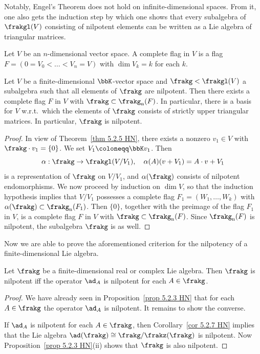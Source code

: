Notably, Engel's Theorem does not hold on infinite-dimensional spaces. From it, one also gets the induction step by which one shows that every subalgebra of $\frakgl(V)$ consisting of nilpotent elements can be written as a Lie algebra of triangular matrices.

\begin{defn}
    Let $V$ be an $n$-dimensional vector space. A complete flag in $V$ is a flag $F=(0=V_0<\ldots <V_n=V)$ with $\dim V_k=k$ for each $k$.
\end{defn}

\begin{cor}[{\cite[Cor.~5.2.7]{HN}}]\label{cor 5.2.7 HN}
    Let $V$ be a finite-dimensional $\bbK$-vector space and $\frakg<\frakgl(V)$ a subalgebra such that all elements of $\frakg$ are nilpotent. Then there exists a complete flag $F$ in $V$ with $\frakg\subset\frakg_{\mathrm{n}}(F)$. In particular, there is a basis for $V$ w.r.t.\ which the elements of $\frakg$ consists of strictly upper triangular matrices. In particular, $\frakg$ is nilpotent.
\end{cor}
\begin{proof}
    In view of Theorem~\ref{thm 5.2.5 HN}, there exists a nonzero $v_1\in V$ with $\frakg\cdot v_1=\{0\}$. We set $V_1\coloneqq \bbK v_1$. Then 
    \[\alpha:\frakg\to\frakgl(V\slash V_1),\quad \alpha(A)(v+V_1)=A\cdot v+V_1\]
    is a representation of $\frakg$ on $V\slash V_1$, and $\alpha(\frakg)$ consists of nilpotent endomorphisms. We now proceed by induction on $\dim V$, so that the induction hypothesis implies that $V\slash V_1$ possesses a complete flag $F_1=(W_1,\ldots,W_k)$ with $\alpha(\frakg)\subset\frakg_{\mathrm{n}}(F_1)$. Then $\{0\}$, together with the preimage of the flag $F_1$ in $V$, is a complete flag $F$ in $V$ with $\frakg\subset\frakg_{\mathrm{n}}(F)$. Since $\frakg_{\mathrm{n}}(F)$ is nilpotent, the subalgebra $\frakg$ is as well.
\end{proof}

Now we are able to prove the aforementioned criterion for the nilpotency of a finite-dimensional Lie algebra.

\begin{thm}\label{cor 5.2.8 HN Engel}
    Let $\frakg$ be a finite-dimensional real or complex Lie algebra. Then $\frakg$ is nilpotent iff the operator $\ad_A$ is nilpotent for each $A\in\frakg$.
\end{thm}
\begin{proof}
    We have already seen in Proposition~\ref{prop 5.2.3 HN} that for each $A\in\frakg$ the operator $\ad_A$ is nilpotent. It remains to show the converse.

    If $\ad_A$ is nilpotent for each $A\in\frakg$, then Corollary~\ref{cor 5.2.7 HN} implies that the Lie algebra $\ad(\frakg)\cong \frakg\slash\frakz(\frakg)$ is nilpotent. Now Proposition~\ref{prop 5.2.3 HN}(ii) shows that $\frakg$ is also nilpotent.
\end{proof}

